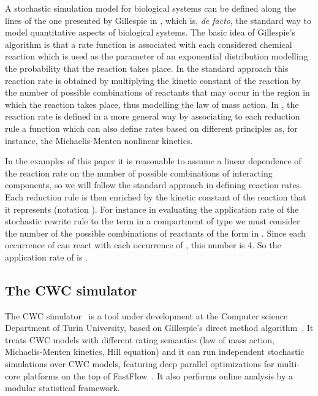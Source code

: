 A stochastic simulation model for biological systems can be defined
along the lines of the one
presented by Gillespie in \cite{G77}, which is, \emph{de facto}, the standard way to model quantitative aspects of biological systems. The basic idea of
Gillespie's algorithm is that a rate function is associated with each considered chemical reaction which is used as the parameter of an exponential distribution modelling the probability that the reaction takes place. In the standard approach this reaction rate is obtained by multiplying the kinetic
constant of the reaction by the number of possible combinations of reactants that may occur in the region in which the reaction takes place, thus modelling the law of mass action. In \cite{preQAPL2010}, the reaction rate is defined in a more general way by associating to each reduction rule a function which can also define rates based on different principles as, for instance, the Michaelis-Menten nonlinear kinetics.

In the examples of this paper it is reasonable to assume a linear dependence of the reaction rate on the number of possible combinations of interacting components, so we will follow the standard approach in defining reaction rates. Each reduction rule is then enriched by the kinetic constant  of the reaction that it represents (notation ).
For instance in evaluating the application rate of the stochastic rewrite rule  to the term  in a compartment of type  we must consider the number of the possible combinations of reactants of
the form  in . Since each occurrence of  can react with each occurrence of , this number is 4. So the application rate of  is
.





\subsection{The CWC simulator}
\label{sec:simulator}


The CWC simulator~\cite{HCWC_SIM} is a tool under development at the Computer science Department of Turin University, based on Gillespie's direct method
algorithm~\cite{G77}. It treats CWC models with different rating semantics (law of mass action, Michaelis-Menten kinetics, Hill equation) and
it can run independent stochastic simulations over CWC models, featuring deep parallel optimizations for multi-core platforms on the top of
FastFlow~\cite{fastflow:web}. It also performs online analysis by a modular statistical framework.





